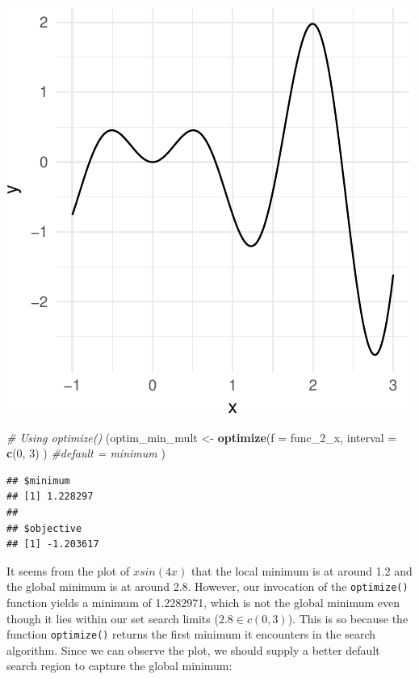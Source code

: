 \documentclass[11pt,]{article}
\newenvironment{Shaded}{\begin{snugshade}}{\end{snugshade}}
\newcommand{\KeywordTok}[1]{\textcolor[rgb]{0.13,0.29,0.53}{\textbf{#1}}}
\newcommand{\DataTypeTok}[1]{\textcolor[rgb]{0.13,0.29,0.53}{#1}}
\newcommand{\DecValTok}[1]{\textcolor[rgb]{0.00,0.00,0.81}{#1}}
\newcommand{\StringTok}[1]{\textcolor[rgb]{0.31,0.60,0.02}{#1}}
\newcommand{\CommentTok}[1]{\textcolor[rgb]{0.56,0.35,0.01}{\textit{#1}}}
\newcommand{\NormalTok}[1]{#1}
\begin{document}
\begin{center}\includegraphics{Optimization_files/figure-latex/opt_unconstr_optimize-2} \end{center}

\begin{Shaded}
\begin{Highlighting}[]
\CommentTok{# Using optimize()}
\NormalTok{(optim_min_mult <-}\StringTok{ }\KeywordTok{optimize}\NormalTok{(}\DataTypeTok{f =}\NormalTok{ func_2_x, }
                            \DataTypeTok{interval =} \KeywordTok{c}\NormalTok{(}\DecValTok{0}\NormalTok{, }\DecValTok{3}\NormalTok{)}
\NormalTok{                            ) }\CommentTok{#default = minimum}
\NormalTok{) }
\end{Highlighting}
\end{Shaded}

\begin{verbatim}
## $minimum
## [1] 1.228297
## 
## $objective
## [1] -1.203617
\end{verbatim}

It seems from the plot of \(xsin(4x)\) that the local minimum is at
around 1.2 and the global minimum is at around 2.8. However, our
invocation of the \texttt{optimize()} function yields a minimum of
1.2282971, which is not the global minimum even though it lies within
our set search limits (\(2.8\in c(0,3)\)). This is so because the
function \texttt{optimize()} returns the first minimum it encounters in
the search algorithm. Since we can observe the plot, we should supply a
better default search region to capture the global minimum:
\end{document}
